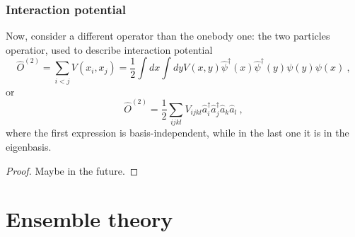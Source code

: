 \subsection{Interaction potential}

    Now, consider a different operator than the onebody one: the two particles operatior, used to describe interaction potential 
    \begin{equation*}
        \hat O^{(2)} = \sum_{i < j} V(x_i, x_j) = \frac{1}{2} \int dx \int dy V(x,y) \hat \psi^\dagger (x) \hat \psi^\dagger (y) \psi(y) \psi (x) ~,
    \end{equation*}
    or 
    \begin{equation*}
        \hat O^{(2)} = \frac{1}{2} \sum_{ijkl} V_{ijkl} \hat a_i^\dagger \hat a_j^\dagger \hat a_k \hat a_l ~,
    \end{equation*}
    where the first expression is basis-independent, while in the last one it is in the eigenbasis. 
    \begin{proof}
        Maybe in the future.
    \end{proof}

\chapter{Ensemble theory}

